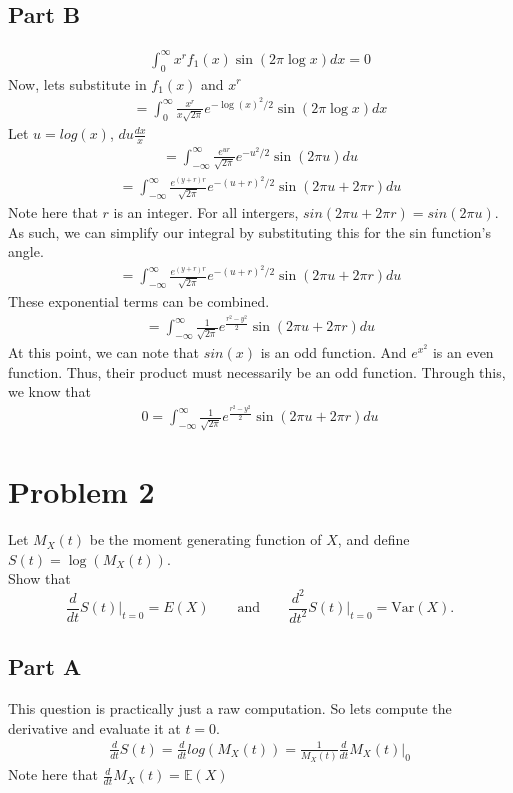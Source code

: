 \documentclass{article}
\begin{document}
\subsection*{Part B}
\begin{align*}
\int_{0}^{\infty}x^rf_1(x)\sin(2\pi\log x)dx=0
\end{align*}
Now, lets substitute in $f_1(x)$ and $x^r$
\begin{align*}
=\int_{0}^{\infty} \frac{x^r}{x\sqrt{2\pi}} e^{-\log(x)^2/2}\sin(2\pi\log x)dx
\end{align*}
Let $u=log(x)$, $du \frac{dx}{x}$
\begin{align*}
= \int_{-\infty}^{\infty} \frac{e^{u r}}{\sqrt{2\pi}} e^{-u^2/2}\sin(2\pi u)du
\end{align*}
\begin{align*}
= \int_{-\infty}^{\infty} \frac{e^{(y+r)r}}{\sqrt{2\pi}} e^{-(u+r)^2/2}\sin(2\pi u+2 \pi r)du
\end{align*}
Note here that $r$ is an integer. For all intergers, $sin(2\pi u+2 \pi r)=sin(2\pi u)$. As such, we can simplify our integral by substituting this for the sin function's angle.
\begin{align*}
= \int_{-\infty}^{\infty} \frac{e^{(y+r)r}}{\sqrt{2\pi}} e^{-(u+r)^2/2}\sin(2\pi u+2 \pi r)du
\end{align*}
These exponential terms can be combined.
\begin{align*}
= \int_{-\infty}^{\infty} \frac{1}{\sqrt{2\pi}} e^{\frac{r^2-y^2}{2}}\sin(2\pi u+2 \pi r)du
\end{align*}
At this point, we can note that $sin(x)$ is an odd function. And $e^{x^2}$ is an even function. Thus, their product must necessarily be an odd function.
Through this, we know that 
\begin{align*}
\boxed{ 0 = \int_{-\infty}^{\infty} \frac{1}{\sqrt{2\pi}} e^{\frac{r^2-y^2}{2}}\sin(2\pi u+2 \pi r)du }
\end{align*}
\clearpage

\section*{Problem 2}
  Let $M_X(t)$ be the moment generating function of $X$, and define $S(t) = \log(M_X(t))$.\\
  Show that
    \[
    \frac{d}{dt}S(t)\biggr\rvert_{t=0} = E(X) \qquad \textrm{and} \qquad \frac{d^2}{dt^2}S(t)\biggr\rvert_{t=0} = \textrm{Var}(X).
    \]
\subsection*{Part A}
This question is practically just a raw computation. So lets compute the derivative and evaluate it at $t=0$.
\begin{align*}
\frac{d}{dt}S(t) = \frac{d}{dt}log(M_X(t)) = \frac{1}{M_X(t)} \frac{d}{dt}M_X(t) |_{0}
\end{align*}
Note here that $\frac{d}{dt}M_X(t)=\mathbb{E}(X)$
\end{document}
